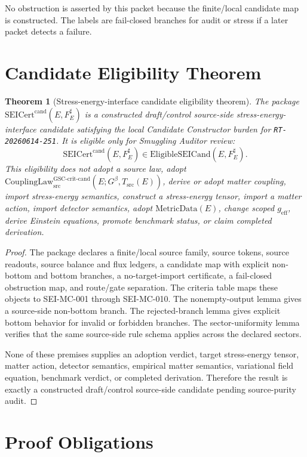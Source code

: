 \documentclass[11pt]{article}
\newcommand{\Gbeta}{G^\beta}
\newcommand{\MetricData}{\mathrm{MetricData}}
\newcommand{\geff}{g_{\mathrm{eff}}}
\newcommand{\CouplingLawCrit}{\mathrm{CouplingLaw}_{\mathrm{src}}^{\mathrm{GSC\mbox{-}crit\mbox{-}cand}}}
\newcommand{\SEICertCand}{\mathrm{SEICert}^{\mathrm{cand}}}
\newcommand{\EligibleSEICand}{\mathrm{EligibleSEICand}}
\newtheorem{theorem}{Theorem}
\begin{document}
No obstruction is asserted by this packet because the finite/local candidate
map is constructed. The labels are fail-closed branches for audit or stress
if a later packet detects a failure.

\section{Candidate Eligibility Theorem}

\begin{theorem}[Stress-energy-interface candidate eligibility theorem]
The package \(\SEICertCand(E,F_E^\sharp)\) is a constructed draft/control
source-side stress-energy-interface candidate satisfying the local Candidate
Constructor burden for \texttt{RT-20260614-251}. It is eligible only for
Smuggling Auditor review:
\[
  \SEICertCand(E,F_E^\sharp)\in
  \EligibleSEICand(E,F_E^\sharp).
\]
This eligibility does not adopt a source law, adopt
\(\CouplingLawCrit(E;\Gbeta,T_{\mathrm{src}}(E))\), derive or adopt matter
coupling, import stress-energy semantics, construct a stress-energy tensor,
import a matter action, import detector semantics, adopt \(\MetricData(E)\),
change scoped \(\geff\), derive Einstein equations, promote benchmark status,
or claim completed derivation.
\end{theorem}

\begin{proof}
The package declares a finite/local source family, source tokens, source
readouts, source balance and flux ledgers, a candidate map with explicit
non-bottom and bottom branches, a no-target-import certificate, a fail-closed
obstruction map, and route/gate separation. The criteria table maps these
objects to SEI-MC-001 through SEI-MC-010. The nonempty-output lemma gives a
source-side non-bottom branch. The rejected-branch lemma gives explicit
bottom behavior for invalid or forbidden branches. The sector-uniformity
lemma verifies that the same source-side rule schema applies across the
declared sectors.

None of these premises supplies an adoption verdict, target stress-energy
tensor, matter action, detector semantics, empirical matter semantics,
variational field equation, benchmark verdict, or completed derivation.
Therefore the result is exactly a constructed draft/control source-side
candidate pending source-purity audit.
\end{proof}

\section{Proof Obligations}
\end{document}
